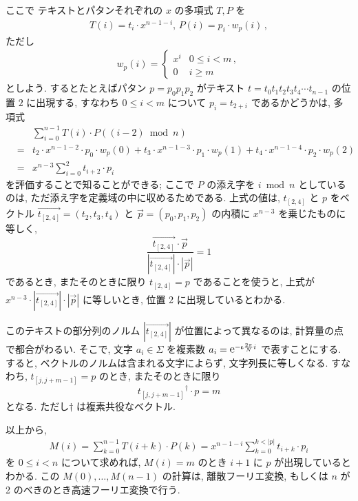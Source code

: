 \documentclass[11pt]{jarticle}
\newcommand{\napier}{%
\mathnormal{\mbox{\large{$\mathrm{e}$}}}    %
}
\begin{document}
ここで 
テキストとパタンそれぞれの $x$ の多項式 $T, P$ を
\begin{eqnarray*}
T(i) = t_i \cdot x^{n-1-i}, \, P(i) = p_i \cdot w_p(i) \,,
\end{eqnarray*}
ただし
\begin{eqnarray*}
w_p(i) = \left\{\begin{array}{ll}
x^i & 0 \leq i < m \,,\\
0 & i \geq m
\end{array}\right.
\end{eqnarray*}
としよう. 
するとたとえばパタン $p = p_0 p_1 p_2$ がテキスト $t = t_0 t_1 t_2 t_3 t_4 \cdots t_{n-1}$ の位置 $2$ に出現する, すなわち $0 \leq i < m$ について $p_i = t_{2+i}$ であるかどうかは, 多項式
\begin{eqnarray*}
&& \sum_{i=0}^{n-1} T(i) \cdot P((i-2) \bmod n) \\
&=& t_2 \cdot x^{n-1-2} \cdot p_0 \cdot w_p(0) + t_3 \cdot x^{n-1-3} \cdot p_1 \cdot w_p(1) + t_4 \cdot x^{n-1-4} \cdot p_2 \cdot w_p(2)\\
&=& x^{n-3}\sum_{i=0}^{2}t_{i+2}\cdot p_{i}
\end{eqnarray*}
を評価することで知ることができる; 
ここで $P$ の添え字を $i \bmod n$ としているのは, ただ添え字を定義域の中に収めるためである. 
上式の値は, $t_{[2,4]}$ と $p$ をベクトル $\vec{t_{[2,4]}} = (t_2, t_3, t_4)$ と $\vec{p} = (p_0, p_1, p_2)$ の内積に $x^{n-3}$ を乗じたものに等しく, 
\[
\frac{\vec{t_{[2,4]}} \cdot \vec{p}}{|\vec{t_{[2,4]}}|\cdot |\vec{p}|} = 1
\]
であるとき, またそのときに限り $t_{[2,4]} = p$ であることを使うと, 上式が $x^{n-3} \cdot |\vec{t_{[2,4]}}|\cdot |\vec{p}|$ に等しいとき, 
位置 2 に出現しているとわかる. 

このテキストの部分列のノルム $|\vec{t_{[2,4]}}|$ が位置によって異なるのは, 計算量の点で都合がわるい. 
そこで, 文字 $a_i \in \Sigma$ を複素数 $a_i = \napier^{-\boldsymbol\iota\frac{2\pi}{N}i}$ で表すことにする.  
すると, ベクトルのノルムは含まれる文字によらず, 文字列長に等しくなる. 
すなわち, $t_{[j,j+m-1]} = p$ のとき, またそのときに限り 
\[
{t_{[j,j+m-1]}}^\dagger \cdot p = m
\]
となる. 
ただし$\dagger$ は複素共役なベクトル. 

以上から, 
\begin{eqnarray*}
M(i) = \sum_{k = 0}^{n-1} T(i+k) \cdot P(k) 
= x^{n-1-i} \sum_{k = 0}^{k < |p|}  t_{i+k} \cdot p_i 
\end{eqnarray*}
を $0 \leq i < n$ について求めれば, $M(i) = m$ のとき $i+1$ に $p$ が出現しているとわかる. 
この $M(0), \ldots, M(n-1)$ の計算は, 離散フーリエ変換, もしくは $n$ が 2 のべきのとき高速フーリエ変換で行う. 
\end{document}
